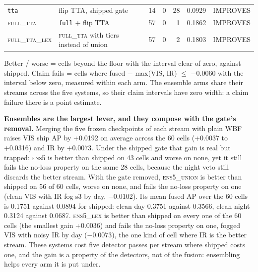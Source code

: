 \documentclass[journal,onecolumn]{IEEEtran}
\begin{document}
\begin{table}[htbp]
\begin{tabularx}{\linewidth}{l>{\raggedright\arraybackslash}Xrrrrl}
\texttt{tta} & flip TTA, shipped gate & 14 & 0 & 28 & 0.0929 & IMPROVES \\
\textsc{full\_tta} & \texttt{full} + flip TTA & 57 & 0 & 1 & 0.1862 & IMPROVES \\
\textsc{full\_tta\_lex} & \textsc{full\_tta} with tiers instead of union & 57 & 0 & 2 & 0.1803 & IMPROVES \\
\bottomrule
\end{tabularx}
\par\smallskip\raggedright\footnotesize Better / worse = cells beyond the floor with the interval clear of zero, against shipped. Claim fails = cells where fused $-$ max(VIS, IR) $\leq$ $-$0.0060 with the interval below zero, measured within each arm. The ensemble arms share their streams across the five systems, so their claim intervals have zero width: a claim failure there is a point estimate.
\end{table}
\textbf{Ensembles are the largest lever, and they compose with the gate's removal.} Merging the five frozen checkpoints of each stream with plain WBF raises VIS ship AP by +0.0192 on average across the 60 cells (+0.0037 to +0.0316) and IR by +0.0073. Under the shipped gate that gain is real but trapped: \textsc{ens5} is better than shipped on 43 cells and worse on none, yet it still fails the no-loss property on the same 28 cells, because the night veto still discards the better stream. With the gate removed, \textsc{ens5\_union} is better than shipped on 56 of 60 cells, worse on none, and fails the no-loss property on one (clean VIS with IR fog s3 by day, $-$0.0102). Its mean fused AP over the 60 cells is 0.1751 against 0.0894 for shipped: clean day 0.3751 against 0.3566, clean night 0.3124 against 0.0687. \textsc{ens5\_lex} is better than shipped on every one of the 60 cells (the smallest gain +0.0036) and fails the no-loss property on one, fogged VIS with noisy IR by day ($-$0.0073), the one kind of cell where IR is the better stream. These systems cost five detector passes per stream where shipped costs one, and the gain is a property of the detectors, not of the fusion: ensembling helps every arm it is put under.
\end{document}
